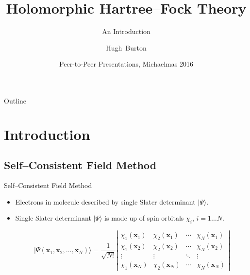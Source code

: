 \documentclass{beamer}
\title[Holomorphic Hartree--Fock Theory]
{%
  Holomorphic Hartree--Fock Theory
}
\subtitle{An Introduction}
\author[Burton, Thom]
{
  \hskip-1.7mm
  Hugh~Burton%
}
\institute[Burton and others]
{
  University of Cambridge
}
\date[P2P 2016]
{Peer-to-Peer Presentations, Michaelmas 2016}
\newcommand{\ket}[1] {{| #1 \rangle}}
\begin{document}
\begin{frame}
  \titlepage
\end{frame}

\begin{frame}{Outline}
  \tableofcontents
\end{frame}


\section{Introduction}

\subsection{Self--Consistent Field Method}

\begin{frame}{Self--Consistent Field Method}
\begin{itemize}
\item<1-> Electrons in molecule described by single Slater determinant $\ket{\Psi}$.

\item<2-> Single Slater determinant $\ket{\Psi}$ is made up of spin orbitals $\chi_i$, $i=1\dots N$.

$$\ket{\Psi(\mathbf{x}_1, \mathbf{x}_2, \ldots, \mathbf{x}_N)} =
\frac{1}{\sqrt{N!}}
\left|
   \begin{matrix} \chi_1(\mathbf{x}_1) & \chi_2(\mathbf{x}_1) & \cdots & \chi_N(\mathbf{x}_1) \\
                      \chi_1(\mathbf{x}_2) & \chi_2(\mathbf{x}_2) & \cdots & \chi_N(\mathbf{x}_2) \\
                      \vdots & \vdots & \ddots & \vdots \\
                      \chi_1(\mathbf{x}_N) & \chi_2(\mathbf{x}_N) & \cdots & \chi_N(\mathbf{x}_N)
   \end{matrix} \right|$$
\end{itemize}
\end{frame}
\end{document}
